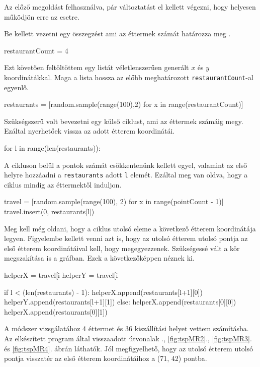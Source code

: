 
Az előző megoldást felhasználva, pár változtatást el kellett végezni, hogy helyesen működjön erre az esetre.

Be kellett vezetni egy összegzést ami az éttermek számát határozza meg \cite{Python}.
\begin{python}
restaurantCount = 4
\end{python}
Ezt követően feltöltöttem egy listát véletlenszerűen generált $x$ és $y$ koordinátákkal. Maga a lista hossza az előbb meghatározott \texttt{restaurantCount}-al egyenlő.
\begin{python}
restaurants = [random.sample(range(100),2)
               for x in range(restaurantCount)] 
\end{python}
Szükségszerű volt bevezetni egy külső ciklust, ami az éttermek számáig megy. Ezáltal nyerhetőek vissza az adott étterem koordinátái.
\begin{python}
for l in range(len(restaurants)):
\end{python}
A cikluson belül a pontok számát csökkentenünk kellett egyel, valamint az első helyre hozzáadni a \texttt{restaurants} adott \texttt{l} elemét. Ezáltal meg van oldva, hogy a ciklus mindig az éttermektől induljon.

\begin{python}
travel = [random.sample(range(100), 2) for x in range(pointCount - 1)]
travel.insert(0, restaurants[l])
\end{python}

Meg kell még oldani, hogy a ciklus utolsó eleme a következő étterem koordinátája legyen. Figyelembe kellett venni azt is, hogy az utolsó étterem utolsó pontja az első étterem koordinátáival kell, hogy megegyezzenek. Szükségessé vált a kör megszakítása is a gráfban. 
Ezek a következőképpen néznek ki. 
\begin{python}
helperX = travel[i %
helperY = travel[i %

if l < (len(restaurants) - 1):
	helperX.append(restaurants[l+1][0])
	helperY.append(restaurants[l+1][1])
else:
	helperX.append(restaurants[0][0])
	helperX.append(restaurants[0][1])
\end{python}


A módszer vizsgálatához 4 éttermet és 36 kiszállítási helyet vettem számításba.
Az elkészített program által visszaadott útvonalak ., \ref{fig:tspMR2}., \ref{fig:tspMR3}.  és \ref{fig:tspMR4}. ábrán láthatók.
Jól megfigyelhető, hogy az utolsó étterem utolsó pontja visszatér az első étterem koordinátáihoz a (71, 42) pontba.


